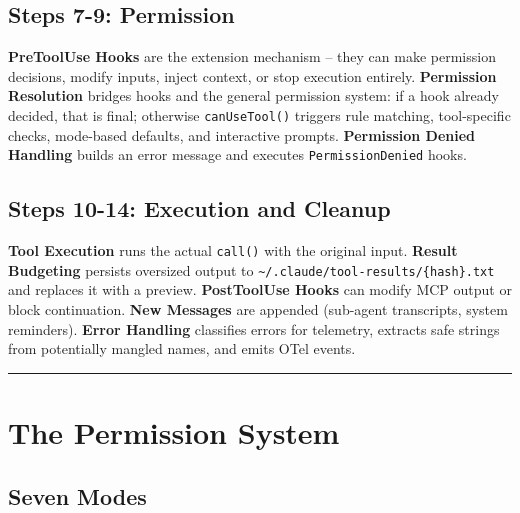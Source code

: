 \documentclass[
  english,
  11pt,
  letterpaper,
]{book}
\begin{document}
\subsection{Steps 7-9: Permission}\label{steps-7-9-permission}

\textbf{PreToolUse Hooks} are the extension mechanism -- they can make
permission decisions, modify inputs, inject context, or stop execution
entirely. \textbf{Permission Resolution} bridges hooks and the general
permission system: if a hook already decided, that is final; otherwise
\texttt{canUseTool()} triggers rule matching, tool-specific checks,
mode-based defaults, and interactive prompts. \textbf{Permission Denied
Handling} builds an error message and executes \texttt{PermissionDenied}
hooks.

\subsection{Steps 10-14: Execution and
Cleanup}\label{steps-10-14-execution-and-cleanup}

\textbf{Tool Execution} runs the actual \texttt{call()} with the
original input. \textbf{Result Budgeting} persists oversized output to
\texttt{\textasciitilde{}/.claude/tool-results/\{hash\}.txt} and
replaces it with a preview. \textbf{PostToolUse Hooks} can modify MCP
output or block continuation. \textbf{New Messages} are appended
(sub-agent transcripts, system reminders). \textbf{Error Handling}
classifies errors for telemetry, extracts safe strings from potentially
mangled names, and emits OTel events.

\begin{center}\rule{0.5\linewidth}{0.5pt}\end{center}

\section{The Permission System}\label{the-permission-system-1}

\subsection{Seven Modes}\label{seven-modes}
\end{document}
